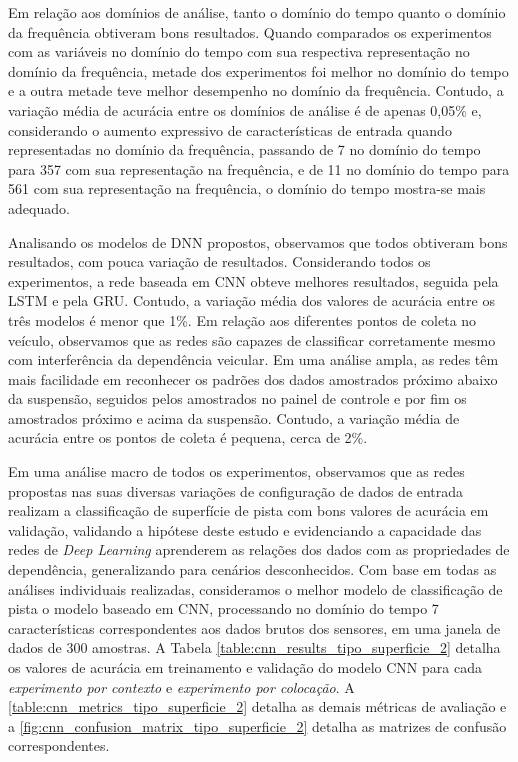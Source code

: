 Em relação aos domínios de análise, tanto o domínio do tempo quanto o domínio da frequência obtiveram bons resultados. Quando comparados os experimentos com as variáveis no domínio do tempo com sua respectiva representação no domínio da frequência, metade dos experimentos foi melhor no domínio do tempo e a outra metade teve melhor desempenho no domínio da frequência. Contudo, a variação média de acurácia entre os domínios de análise é de apenas 0,05\% e, considerando o aumento expressivo de características de entrada quando representadas no domínio da frequência, passando de 7 no domínio do tempo para 357 com sua representação na frequência, e de 11 no domínio do tempo para 561 com sua representação na frequência, o domínio do tempo mostra-se mais adequado.

Analisando os modelos de DNN propostos, observamos que todos obtiveram bons resultados, com pouca variação de resultados. Considerando todos os experimentos, a rede baseada em CNN obteve melhores resultados, seguida pela LSTM e pela GRU. Contudo, a variação média dos valores de acurácia entre os três modelos é menor que 1\%. Em relação aos diferentes pontos de coleta no veículo, observamos que as redes são capazes de classificar corretamente mesmo com interferência da dependência veicular. Em uma análise ampla, as redes têm mais facilidade em reconhecer os padrões dos dados amostrados próximo abaixo da suspensão, seguidos pelos amostrados no painel de controle e por fim os amostrados próximo e acima da suspensão. Contudo, a variação média de acurácia entre os pontos de coleta é pequena, cerca de 2\%.

Em uma análise macro de todos os experimentos, observamos que as redes propostas nas suas diversas variações de configuração de dados de entrada realizam a classificação de superfície de pista com bons valores de acurácia em validação, validando a hipótese deste estudo e evidenciando a capacidade das redes de \textit{Deep Learning} aprenderem as relações dos dados com as propriedades de dependência, generalizando para cenários desconhecidos. Com base em todas as análises individuais realizadas, consideramos o melhor modelo de classificação de pista o modelo baseado em CNN, processando no domínio do tempo 7 características correspondentes aos dados brutos dos sensores, em uma janela de dados de 300 amostras. A Tabela \ref{table:cnn_results_tipo_superficie_2} detalha os valores de acurácia em treinamento e validação do modelo CNN para cada \emph{experimento por contexto} e \emph{experimento por colocação}. A \autoref{table:cnn_metrics_tipo_superficie_2} detalha as demais métricas de avaliação e a \autoref{fig:cnn_confusion_matrix_tipo_superficie_2} detalha as matrizes de confusão correspondentes.

